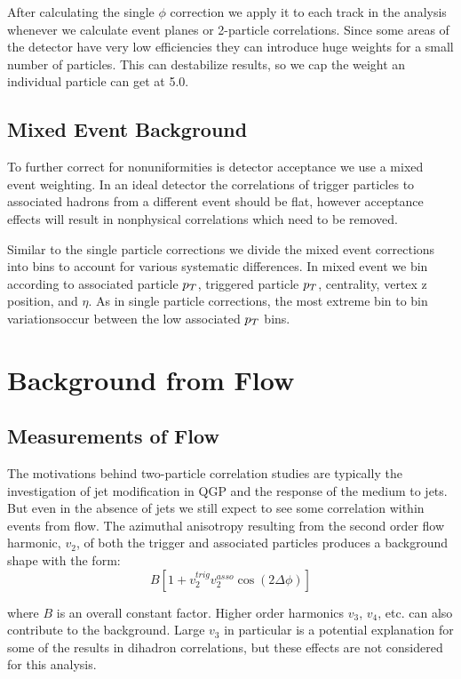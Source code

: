 After calculating the single $\phi$ correction we apply it to each track in the analysis whenever we calculate event planes or 2-particle correlations. Since some areas of the detector have very low efficiencies they can introduce huge weights for a small number of particles. This can destabilize results, so we cap the weight an individual particle can get at 5.0.

\subsection{Mixed Event Background}

To further correct for nonuniformities is detector acceptance we use a mixed event weighting. In an ideal detector the correlations of trigger particles to associated hadrons from a different event should be flat, however acceptance effects will result in nonphysical correlations which need to be removed. 

Similar to the single particle corrections we divide the mixed event corrections into bins to account for various systematic differences. In mixed event we bin according to associated particle $p_{T}$, triggered particle $p_{T}$, centrality, vertex z position, and $\eta$. As in single particle corrections, the most extreme bin to bin variationsoccur between the low associated $p_{T}$ bins.   

\section{Background from Flow}

\subsection{Measurements of Flow}

The motivations behind two-particle correlation studies are typically the investigation of jet modification in QGP and the response of the medium to jets. But even in the absence of jets we still expect to see some correlation within events from flow. The azimuthal anisotropy resulting from the second order flow harmonic, $v_2$, of both the trigger and associated particles produces a background shape with the form:
\begin{equation}\label{eq:v2background}
 B[1 + v^{trig}_{2}v^{asso}_{2} \cos(2\Delta\phi)] 
\end{equation}

where $B$ is an overall constant factor. Higher order harmonics $v_3$, $v_4$, etc. can also contribute to the background. Large $v_3$ in particular is a potential explanation for some of the results in dihadron correlations, but these effects are not considered for this analysis. 

